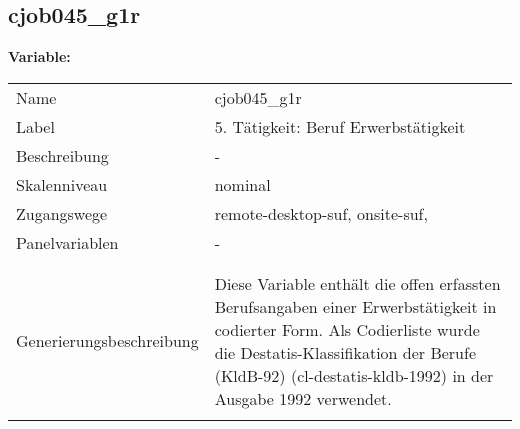 	
	
	\subsection{cjob045\_g1r}
	\label{subSection:cjob045_g1r}

	\noindent\textbf{Variable:}\\
		\begin{tabular}{lL{11.3cm}}
			\label{tableVariable:cjob045_g1r}
			Name & cjob045\_g1r \\
			Label & 5. Tätigkeit: Beruf Erwerbstätigkeit \\
			Beschreibung & - \\
			Skalenniveau & nominal \\
			Zugangswege &
				remote-desktop-suf,
				onsite-suf,
 \\
			Panelvariablen & -
			 \\
			 \\
 \\
					Generierungsbeschreibung & Diese Variable enthält die offen erfassten Berufsangaben einer Erwerbstätigkeit in codierter Form. Als Codierliste wurde die Destatis-Klassifikation der Berufe (KldB-92) (cl-destatis-kldb-1992) in der Ausgabe 1992 verwendet. 
				 \\	
			 \\
		\end{tabular}






